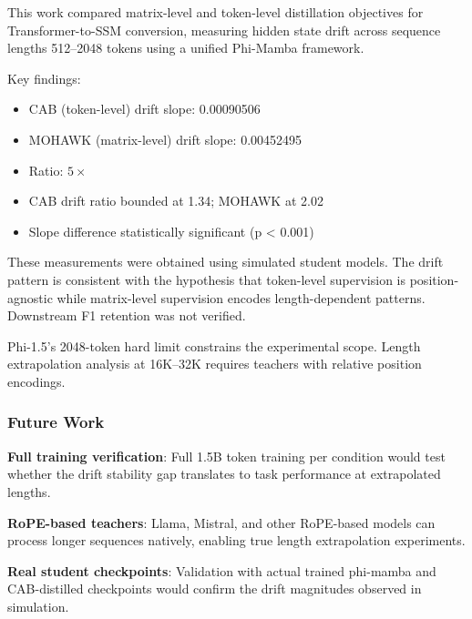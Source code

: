 
This work compared matrix-level and token-level distillation objectives for Transformer-to-SSM conversion, measuring hidden state drift across sequence lengths 512--2048 tokens using a unified Phi-Mamba framework.

Key findings:
\begin{itemize}
\item CAB (token-level) drift slope: 0.00090506
\item MOHAWK (matrix-level) drift slope: 0.00452495
\item Ratio: $5\times$
\item CAB drift ratio bounded at 1.34; MOHAWK at 2.02
\item Slope difference statistically significant (p < 0.001)
\end{itemize}

These measurements were obtained using simulated student models. The drift pattern is consistent with the hypothesis that token-level supervision is position-agnostic while matrix-level supervision encodes length-dependent patterns. Downstream F1 retention was not verified.

Phi-1.5's 2048-token hard limit constrains the experimental scope. Length extrapolation analysis at 16K--32K requires teachers with relative position encodings.

\subsubsection{Future Work}

\textbf{Full training verification}: Full 1.5B token training per condition would test whether the drift stability gap translates to task performance at extrapolated lengths.

\textbf{RoPE-based teachers}: Llama, Mistral, and other RoPE-based models can process longer sequences natively, enabling true length extrapolation experiments.

\textbf{Real student checkpoints}: Validation with actual trained phi-mamba and CAB-distilled checkpoints would confirm the drift magnitudes observed in simulation.

